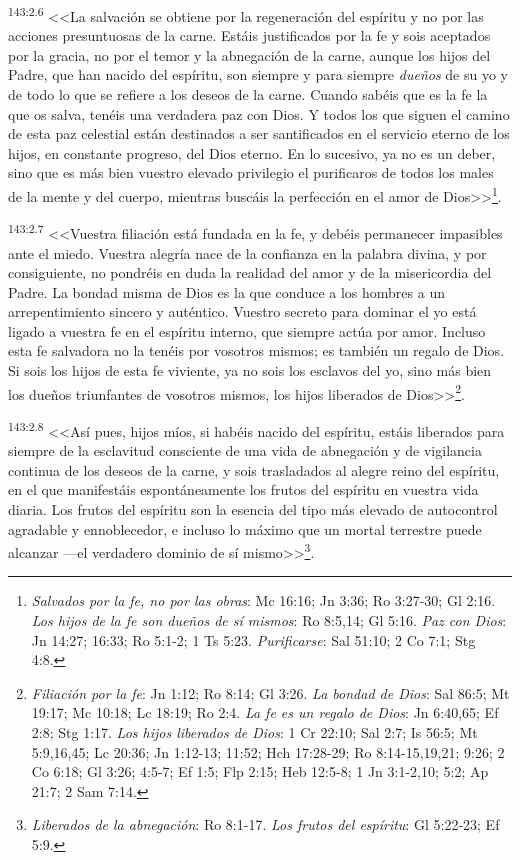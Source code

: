 \par 
\textsuperscript{143:2.6} <<La salvación se obtiene por la regeneración del espíritu y no por las acciones presuntuosas de la carne. Estáis justificados por la fe y sois aceptados por la gracia, no por el temor y la abnegación de la carne, aunque los hijos del Padre, que han nacido del espíritu, son siempre y para siempre \textit{dueños} de su yo y de todo lo que se refiere a los deseos de la carne. Cuando sabéis que es la fe la que os salva, tenéis una verdadera paz con Dios. Y todos los que siguen el camino de esta paz celestial están destinados a ser santificados en el servicio eterno de los hijos, en constante progreso, del Dios eterno. En lo sucesivo, ya no es un deber, sino que es más bien vuestro elevado privilegio el purificaros de todos los males de la mente y del cuerpo, mientras buscáis la perfección en el amor de Dios>>\footnote{\textit{Salvados por la fe, no por las obras}: Mc 16:16; Jn 3:36; Ro 3:27-30; Gl 2:16. \textit{Los hijos de la fe son dueños de sí mismos}: Ro 8:5,14; Gl 5:16. \textit{Paz con Dios}: Jn 14:27; 16:33; Ro 5:1-2; 1 Ts 5:23. \textit{Purificarse}: Sal 51:10; 2 Co 7:1; Stg 4:8.}.

\par 
\textsuperscript{143:2.7} <<Vuestra filiación está fundada en la fe, y debéis permanecer impasibles ante el miedo. Vuestra alegría nace de la confianza en la palabra divina, y por consiguiente, no pondréis en duda la realidad del amor y de la misericordia del Padre. La bondad misma de Dios es la que conduce a los hombres a un arrepentimiento sincero y auténtico. Vuestro secreto para dominar el yo está ligado a vuestra fe en el espíritu interno, que siempre actúa por amor. Incluso esta fe salvadora no la tenéis por vosotros mismos; es también un regalo de Dios. Si sois los hijos de esta fe viviente, ya no sois los esclavos del yo, sino más bien los dueños triunfantes de vosotros mismos, los hijos liberados de Dios>>\footnote{\textit{Filiación por la fe}: Jn 1:12; Ro 8:14; Gl 3:26. \textit{La bondad de Dios}: Sal 86:5; Mt 19:17; Mc 10:18; Lc 18:19; Ro 2:4. \textit{La fe es un regalo de Dios}: Jn 6:40,65; Ef 2:8; Stg 1:17. \textit{Los hijos liberados de Dios}: 1 Cr 22:10; Sal 2:7; Is 56:5; Mt 5:9,16,45; Lc 20:36; Jn 1:12-13; 11:52; Hch 17:28-29; Ro 8:14-15,19,21; 9:26; 2 Co 6:18; Gl 3:26; 4:5-7; Ef 1:5; Flp 2:15; Heb 12:5-8; 1 Jn 3:1-2,10; 5:2; Ap 21:7; 2 Sam 7:14.}.

\par 
\textsuperscript{143:2.8} <<Así pues, hijos míos, si habéis nacido del espíritu, estáis liberados para siempre de la esclavitud consciente de una vida de abnegación y de vigilancia continua de los deseos de la carne, y sois trasladados al alegre reino del espíritu, en el que manifestáis espontáneamente los frutos del espíritu en vuestra vida diaria. Los frutos del espíritu son la esencia del tipo más elevado de autocontrol agradable y ennoblecedor, e incluso lo máximo que un mortal terrestre puede alcanzar ---el verdadero dominio de sí mismo>>\footnote{\textit{Liberados de la abnegación}: Ro 8:1-17. \textit{Los frutos del espíritu}: Gl 5:22-23; Ef 5:9.}.

